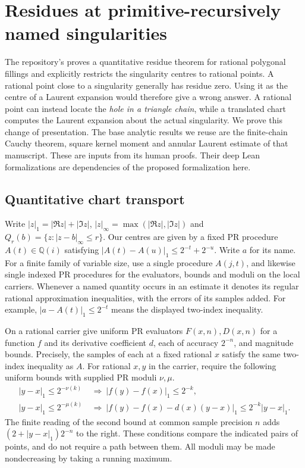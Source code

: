 \section{Residues at primitive-recursively named singularities}\label{sec:named-residue}

The repository's  proves a quantitative
residue theorem for rational polygonal fillings and explicitly restricts the
singularity centres to rational points. A rational point close to a singularity
generally has residue zero. Using it as the centre of a Laurent expansion would
therefore give a wrong answer. A rational point can instead locate the
\emph{hole in a triangle chain}, while a translated chart computes the Laurent
expansion about the actual singularity. We prove this change of presentation.
The base analytic results we reuse are the finite-chain Cauchy theorem, square
kernel moment and annular Laurent estimate of that manuscript. These are inputs
from its human proofs. Their deep Lean formalizations are dependencies of the
proposed formalization here.

\subsection{Quantitative chart transport}

Write $|z|_1=|\Re z|+|\Im z|$, $|z|_\infty=\max(|\Re z|,|\Im z|)$ and
$Q_r(b)=\{z:|z-b|_\infty\le r\}$. Our centres are given by a fixed PR
procedure $A(t)\in\mathbb Q(i)$ satisfying
$|A(t)-A(u)|_1\le2^{-t}+2^{-u}$. Write $a$ for its name. For a finite
family of variable size, use a single procedure $A(j,t)$, and likewise
single indexed PR procedures for the evaluators, bounds and moduli on
the local carriers.
Whenever a named quantity occurs in an estimate it denotes its regular
rational approximation inequalities, with the errors of its samples
added. For example, $|a-A(t)|_1\le2^{-t}$ means the displayed
two-index inequality.

On a rational carrier give uniform PR evaluators $F(x,n),D(x,n)$ for a
function $f$ and its derivative coefficient $d$, each of accuracy $2^{-n}$,
and magnitude bounds. Precisely, the samples of each at a fixed rational
$x$ satisfy the same two-index inequality as $A$. For rational $x,y$ in
the carrier, require the following uniform bounds with supplied PR moduli $\nu,\mu$.
\begin{align*}
 |y-x|_1\le2^{-\nu(k)}&\ \Longrightarrow\ |f(y)-f(x)|_1\le2^{-k},\\
 |y-x|_1\le2^{-\mu(k)}&\ \Longrightarrow\
 |f(y)-f(x)-d(x)(y-x)|_1\le2^{-k}|y-x|_1 .
\end{align*}
The finite reading of the second bound at common sample precision $n$
adds $(2+|y-x|_1)2^{-n}$ to the right. These conditions compare the
indicated pairs of points, and do not require a path between them.
All moduli may be made nondecreasing by taking a running maximum.

